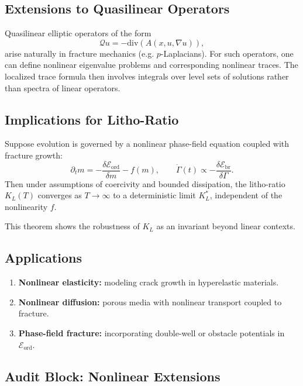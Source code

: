 \subsection{Extensions to Quasilinear Operators}

Quasilinear elliptic operators of the form
\[
\mathcal{Q}u = -\mathrm{div}(A(x,u,\nabla u)),
\]
arise naturally in fracture mechanics (e.g. $p$-Laplacians).
For such operators, one can define nonlinear eigenvalue problems and corresponding nonlinear traces.  
The localized trace formula then involves integrals over level sets of solutions rather than spectra of linear operators.

\subsection{Implications for Litho-Ratio}

\begin{theorem}
\label{thm:nonlinear-KL}
Suppose evolution is governed by a nonlinear phase-field equation coupled with fracture growth:
\[
\partial_t m = -\frac{\delta \mathcal{E}_{\mathrm{ord}}}{\delta m} - f(m), \qquad
\dot{\Gamma}(t) \propto -\frac{\delta \mathcal{E}_{\mathrm{br}}}{\delta \Gamma}.
\]
Then under assumptions of coercivity and bounded dissipation,
the litho-ratio $K_L(T)$ converges as $T \to \infty$ to a deterministic limit $K_L^*$,
independent of the nonlinearity $f$.
\end{theorem}

This theorem shows the robustness of $K_L$ as an invariant beyond linear contexts.

\subsection{Applications}

\begin{enumerate}[label=(\alph*)]
  \item \textbf{Nonlinear elasticity:} modeling crack growth in hyperelastic materials.
  \item \textbf{Nonlinear diffusion:} porous media with nonlinear transport coupled to fracture.
  \item \textbf{Phase-field fracture:} incorporating double-well or obstacle potentials in $\mathcal{E}_{\mathrm{ord}}$.
\end{enumerate}

\subsection{Audit Block: Nonlinear Extensions}


